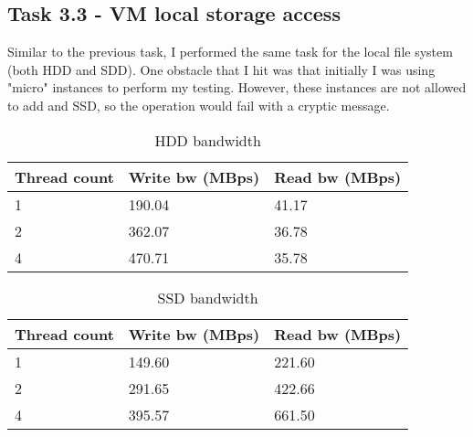 \documentclass[paper=a4, fontsize=11pt]{scrartcl}
\numberwithin{equation}{section}    %
\numberwithin{figure}{section}      %
\numberwithin{table}{section}       %
\begin{document}
\subsection{Task 3.3 - VM local storage access}

Similar to the previous task, I performed the same task for the local file system (both HDD and SDD).
One obstacle that I hit was that initially I was using "micro" instances to perform my testing. However, these instances are not allowed to add and SSD, so the operation would fail with a cryptic message.


\begin{table}[htb]
\centering
\caption{HDD bandwidth}
\begin{tabular}{|l|l|l|}
\hline
Thread count & Write bw (MBps) & Read bw (MBps) \\ \hline
1            & 190.04          & 41.17          \\ \hline
2            & 362.07          & 36.78          \\ \hline
4            & 470.71          & 35.78          \\ \hline
\end{tabular}
\end{table}

\begin{table}[htb]
\centering
\caption{SSD bandwidth}
\begin{tabular}{|l|l|l|}
\hline
Thread count & Write bw (MBps) & Read bw (MBps) \\ \hline
1            & 149.60          & 221.60          \\ \hline
2            & 291.65          & 422.66          \\ \hline
4            & 395.57          & 661.50          \\ \hline
\end{tabular}
\end{table}

\end{document}
